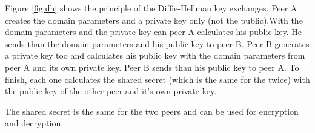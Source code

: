 Figure \ref{fig:dh} shows the principle of the Diffie-Hellman key
exchanges.\newline 
Peer A creates the domain parameters and a private key only (not the
public).\newline With the domain parameters and the private key can peer A
calculates his public key.\newline
He sends than the domain parameters and his public key to peer B.\newline
Peer B generates a private key too and calculates his public key with the domain
parameters from peer A and its own private key.\newline
Peer B sends than his public key to peer A.\newline
To finish, each one calculates the shared secret (which is the same for the
twice) with the public key of the other peer and it's own private key.\newline

The shared secret is the same for the two peers and can be used for encryption
and decryption.
\newpage

